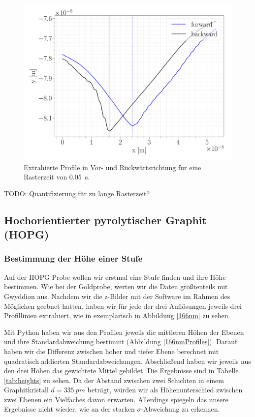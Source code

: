 \begin{figure}[H]
\centering
\includegraphics[width=\textwidth]{../Figures/TIME_005_profile.pdf}
\caption{Extrahierte Profile in Vor- und Rückwärtsrichtung für eine Rasterzeit von \SI{0.05}{s}.}
\label{TIME_005_profile}
\end{figure}


TODO: Quantifizierung für zu lange Rasterzeit?


\subsection{Hochorientierter pyrolytischer Graphit (HOPG)}
\subsubsection{Bestimmung der Höhe einer Stufe}

Auf der HOPG Probe wollen wir erstmal eine Stufe finden und ihre Höhe bestimmen. Wie bei der Goldprobe, werten wir die Daten größtenteils mit Gwyddion aus. Nachdem wir die z-Bilder mit der Software im Rahmen des Möglichen geebnet hatten, haben wir für jede der drei Auflösungen jeweils drei Profillinien extrahiert, wie in exemplarisch in Abbildung \ref{166nm} zu sehen.

Mit Python haben wir aus den Profilen jeweils die mittleren Höhen der Ebenen und ihre Standardabweichung bestimmt (Abbildung \ref{166nmProfiles}). Darauf haben wir die Differenz zwischen hoher und tiefer Ebene berechnet mit quadratisch addierten Standardabweichungen. Abschließend haben wir jeweils aus den drei Höhen das gewichtete Mittel gebildet. Die Ergebnisse sind in Tabelle \ref{tab:heights} zu sehen. Da der Abstand zwischen zwei Schichten in einem Graphitkristall $d = \SI{335}{pm}$ beträgt, würden wir als Höhenunterschied zwischen zwei Ebenen ein Vielfaches davon erwarten. Allerdings spiegeln das unsere Ergebnisse nicht wieder, wie an der starken $\sigma$-Abweichung zu erkennen.

